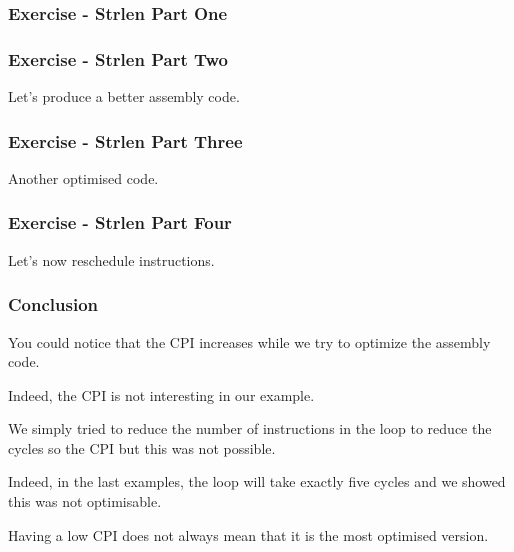 \begin{frame}
  \frametitle{Exercise - Strlen Part One}

  \begin{center}
  \end{center}
\end{frame}


\begin{frame}
  \frametitle{Exercise - Strlen Part Two}

  Let's produce a better assembly code.

  \begin{center}
  \end{center}
\end{frame}


\begin{frame}
  \frametitle{Exercise - Strlen Part Three}

  Another optimised code.

  \begin{center}
  \end{center}
\end{frame}


\begin{frame}
  \frametitle{Exercise - Strlen Part Four}

  Let's now reschedule instructions.

  \begin{center}
  \end{center}
\end{frame}


\begin{frame}
  \frametitle{Conclusion}

  You could notice that the CPI increases while we try to
  optimize the assembly code.

  \-

  Indeed, the CPI is not interesting in our example.

  \-

  We simply tried to reduce the number of instructions in the loop
  to reduce the cycles so the CPI but this was not possible.

  \-

  Indeed, in the last examples, the loop will take exactly five cycles
  and we showed this was not optimisable.

  \-

  Having a low CPI does not always mean that it is the most optimised version.
\end{frame}

